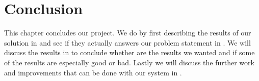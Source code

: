 \chapter{Conclusion}\label{chap:conclusion}
This chapter concludes our project. We do by first describing the results of our solution in  and see if they actually answers our problem statement in . We will discuss the results in  to conclude whether are the results we wanted and if some of the results are especially good or bad. Lastly we will discuss the further work and improvements that can be done with our system in .

\lipsum
